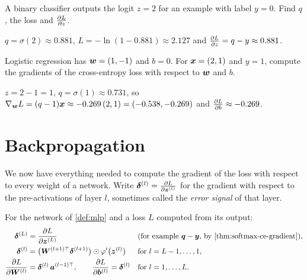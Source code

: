 \begin{exercise}
A binary classifier outputs the logit $z = 2$ for an example with label $y = 0$.
Find $q$, the loss and $\frac{\partial L}{\partial z}$.
\end{exercise}
\begin{solution}
$q = \sigma(2) \approx 0.881$, $L = -\ln(1 - 0.881) \approx 2.127$ and
$\frac{\partial L}{\partial z} = q - y \approx 0.881$.
\end{solution}

\begin{exercise}
Logistic regression has $\bm{w} = (1, -1)$ and $b = 0$. For $\bm{x} = (2, 1)$ and $y = 1$,
compute the gradients of the cross-entropy loss with respect to $\bm{w}$ and $b$.
\end{exercise}
\begin{solution}
$z = 2 - 1 = 1$, $q = \sigma(1) \approx 0.731$, so $\nabla_{\bm{w}}L = (q - 1)\bm{x} \approx
-0.269\,(2, 1) = (-0.538, -0.269)$ and $\frac{\partial L}{\partial b} \approx -0.269$.
\end{solution}

\section{Backpropagation}\label{sec:backpropagation}

We now have everything needed to compute the gradient of the loss with respect to
every weight of a network. Write $\bm{\delta}^{(l)} = \frac{\partial L}{\partial \bm{z}^{(l)}}$ for the
gradient with respect to the pre-activations of layer $l$, sometimes called the
\emph{error signal} of that layer.

\begin{theorem}\label{thm:backprop}
For the network of \cref{def:mlp} and a loss $L$ computed from its output:
\begin{align*}
  \vdelta^{(L)} &= \pderiv{L}{\vz^{(L)}}
    &&\text{(for example $\vq - \vy$, by \cref{thm:softmax-ce-gradient})},\\
  \vdelta^{(l)} &= \bigl(\mW^{(l+1)\top}\vdelta^{(l+1)}\bigr) \odot \varphi'\bigl(\vz^{(l)}\bigr)
    &&\text{for } l = L - 1, \dots, 1,\\
  \pderiv{L}{\mW^{(l)}} &= \vdelta^{(l)}\,\va^{(l-1)\top},
  \qquad \pderiv{L}{\vb^{(l)}} = \vdelta^{(l)}
    &&\text{for } l = 1, \dots, L .
\end{align*}
\end{theorem}

